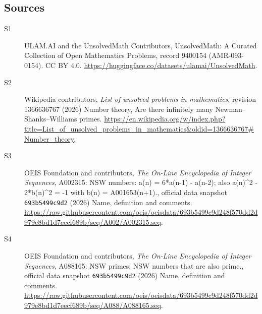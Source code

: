 \documentclass[11pt]{article}
\begin{document}
\subsection{Sources}
\begin{description}
\item[\hypertarget{source:9400154:1}{S1}] ULAM.AI and the UnsolvedMath Contributors, UnsolvedMath: A Curated Collection of Open Mathematics Problems, record 9400154 (AMR-093-0154). CC BY 4.0. \url{https://huggingface.co/datasets/ulamai/UnsolvedMath}.
\item[\hypertarget{source:9400154:2}{S2}] Wikipedia contributors, \emph{List of unsolved problems in mathematics}, revision 1366636767 (2026) Number theory, Are there infinitely many Newman–Shanks–Williams primes. \url{https://en.wikipedia.org/w/index.php?title=List_of_unsolved_problems_in_mathematics&oldid=1366636767#Number_theory}.
\item[\hypertarget{source:9400154:3}{S3}] OEIS Foundation and contributors, \emph{The On-Line Encyclopedia of Integer Sequences}, A002315: NSW numbers: a(n) = 6*a(n-1) - a(n-2); also a(n)\textasciicircum{}2 - 2*b(n)\textasciicircum{}2 = -1 with b(n) = A001653(n+1)., official data snapshot \texttt{693b5499c9d2} (2026) Name, definition and comments. \url{https://raw.githubusercontent.com/oeis/oeisdata/693b5499c9d248f570dd2d979e8bd1d7eecf689b/seq/A002/A002315.seq}.
\item[\hypertarget{source:9400154:4}{S4}] OEIS Foundation and contributors, \emph{The On-Line Encyclopedia of Integer Sequences}, A088165: NSW primes: NSW numbers that are also prime., official data snapshot \texttt{693b5499c9d2} (2026) Name, definition and comments. \url{https://raw.githubusercontent.com/oeis/oeisdata/693b5499c9d248f570dd2d979e8bd1d7eecf689b/seq/A088/A088165.seq}.
\end{description}
\label{end:9400154}
\end{document}
